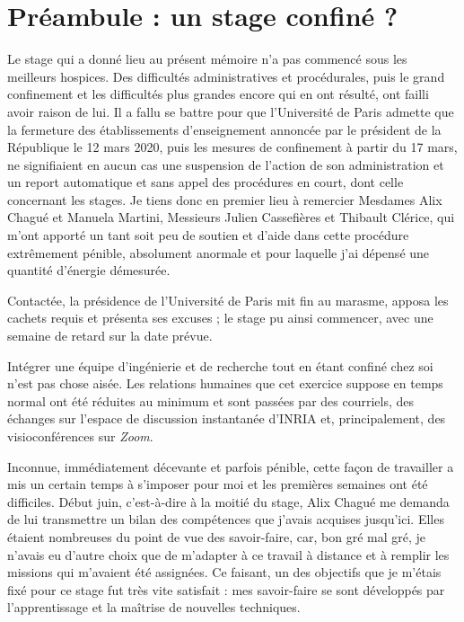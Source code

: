 \section*{Préambule : un stage confiné ?}

Le stage qui a donné lieu au présent mémoire n'a pas commencé sous les meilleurs hospices. Des difficultés administratives et procédurales, puis le grand confinement et les difficultés plus grandes encore qui en ont résulté, ont failli avoir raison de lui. Il a fallu se battre pour que l'Université de Paris admette que la fermeture des établissements d'enseignement annoncée par le président de la République le 12 mars 2020, puis les mesures de confinement à partir du 17 mars, ne signifiaient en aucun cas une suspension de l'action de son administration et un report automatique et sans appel des procédures en court, dont celle concernant les stages. Je tiens donc en premier lieu à remercier Mesdames Alix Chagué et Manuela Martini, Messieurs Julien Cassefières et Thibault Clérice, qui m'ont apporté un tant soit peu de soutien et d'aide dans cette procédure extrêmement pénible, absolument anormale et pour laquelle j'ai dépensé une quantité d'énergie démesurée.

Contactée, la présidence de l'Université de Paris mit fin au marasme, apposa les cachets requis et présenta ses excuses ; le stage pu ainsi commencer, avec une semaine de retard sur la date prévue.

Intégrer une équipe d'ingénierie et de recherche tout en étant confiné chez soi n'est pas chose aisée. Les relations humaines que cet exercice suppose en temps normal ont été réduites au minimum et sont passées par des courriels, des échanges sur l'espace de discussion instantanée d'INRIA et, principalement, des visioconférences sur \textit{Zoom}.

Inconnue, immédiatement décevante et parfois pénible, cette façon de travailler a mis un certain temps à s'imposer pour moi et les premières semaines ont été difficiles. Début juin, c'est-à-dire à la moitié du stage, Alix Chagué me demanda de lui transmettre un bilan des compétences que j'avais acquises jusqu'ici. Elles étaient nombreuses du point de vue des savoir-faire, car, bon gré mal gré, je n'avais eu d'autre choix que de m'adapter à ce travail à distance et à remplir les missions qui m'avaient été assignées. Ce faisant, un des objectifs que je m'étais fixé pour ce stage fut très vite satisfait : mes savoir-faire se sont développés par l'apprentissage et la maîtrise de nouvelles techniques.

